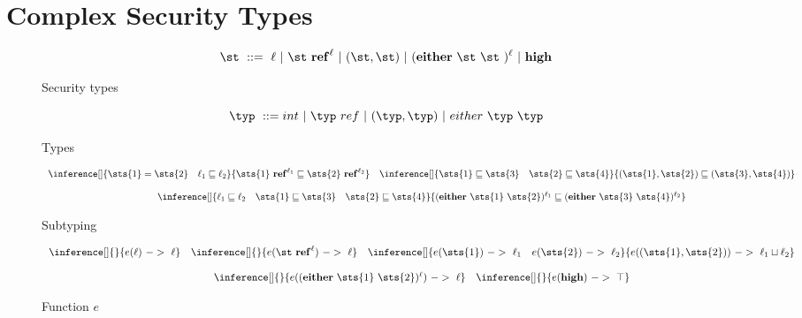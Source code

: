 
\section{Complex Security Types}
\label{chap3:CSL}


\begin{figure}[t]
\[
\st\ ::=\ \ell\ |\ \st\ {\mathbf{ref}}^{\ell}\ |\ (\st,\st)\ |\ ({\mathbf{either}}\ \st\ \st\ )^{\ell}\ |\ {\mathbf{high}}
\]
\caption{Security types}
\label{fig:cst}
\end{figure}

\begin{figure}[t]
\[
\typ\ ::= int\ |\ \typ\ ref\ |\ (\typ,\typ)\ |\ either\ \typ\ \typ 
\]
\caption{Types}
\label{fig:types}
\end{figure}

\begin{figure}[t]
\[
 \begin{array}{c}
   \inference[]{\sts{1}=\sts{2} \quad \ell_1 \sqsubseteq \ell_2}
               {\sts{1}\ \mathbf{ref}^{\ell_1} \sqsubseteq \sts{2}\ \mathbf{ref}^{\ell_2}} \quad
   \inference[]{\sts{1} \sqsubseteq \sts{3} \quad \sts{2} \sqsubseteq \sts{4} }
               {(\sts{1},\sts{2}) \sqsubseteq (\sts{3},\sts{4})} \\ \\
   \inference[]{\ell_1 \sqsubseteq \ell_2 \quad \sts{1} \sqsubseteq \sts{3} \quad \sts{2} \sqsubseteq \sts{4}}
               {(\mathbf{either}\ \sts{1}\ \sts{2})^{\ell_1} \sqsubseteq
                (\mathbf{either}\ \sts{3}\ \sts{4})^{\ell_2} }
 \end{array} 
\]
\caption{Subtyping}
\label{fig:subtyping}
\end{figure}

\begin{figure}[t]
\[
  \begin{array}{c}
  \inference[]{}{e(\ell)~->~\ell} \quad
  \inference[]{}{e(\st~\mathbf{ref}^\ell)~->~\ell} \quad
  \inference[]{e(\sts{1})~->~\ell_1 \quad e(\sts{2})~->~\ell_2}
              {e((\sts{1},\sts{2}))~->~\ell_1\sqcup \ell_2} \\ \\
  \inference[]{}
              {e((\mathbf{either}~\sts{1}~\sts{2})^\ell)~->~\ell} \quad
  \inference[]{}{e(\mathbf{high})~->~\top} \\
  \end{array}
\]
\caption{Function $e$}
\label{fig:extract}
\end{figure}

